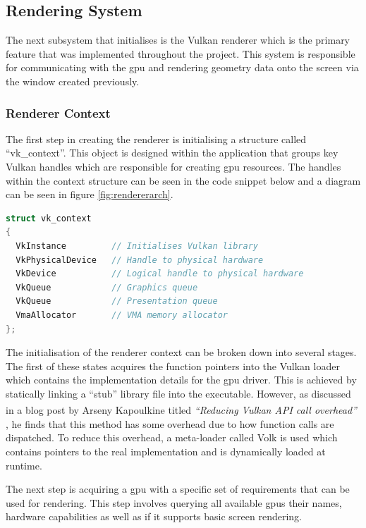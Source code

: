 \documentclass[11pt]{article}
\begin{document}
\subsection{Rendering System}
The next subsystem that initialises is the Vulkan renderer which is the primary
feature that was implemented throughout the project. This system is responsible
for communicating with the \gls*{gpu} and rendering geometry data onto the
screen via the window created previously.

\subsubsection{Renderer Context}
The first step in creating the renderer is initialising a structure called
``vk\_context''. This object is designed  within the application that groups key
Vulkan handles which are responsible for creating \gls*{gpu} resources. The
handles within the context structure can be seen in the code snippet below and a
diagram can be seen in figure \ref{fig:rendererarch}.

\begin{lstlisting}[language=C++]
struct vk_context
{
  VkInstance         // Initialises Vulkan library
  VkPhysicalDevice   // Handle to physical hardware
  VkDevice           // Logical handle to physical hardware
  VkQueue            // Graphics queue
  VkQueue            // Presentation queue
  VmaAllocator       // VMA memory allocator
};
\end{lstlisting}

The initialisation of the renderer context can be broken down into several
stages. The first of these states acquires the function pointers into the Vulkan
loader which contains the implementation details for the \gls*{gpu} driver. This
is achieved by statically linking a ``stub'' library file into the executable.
However, as discussed in a blog post by Arseny Kapoulkine titled
\textit{``Reducing Vulkan\textsuperscript{\textregistered} API call overhead''}
\cite{volk}, he finds that this method has some overhead due to how function
calls are dispatched. To reduce this overhead, a meta-loader called Volk is used
which contains pointers to the real implementation and is dynamically loaded at
runtime.

The next step is acquiring a \gls*{gpu} with a specific set of requirements that
can be used for rendering. This step involves querying all available \glspl*{gpu}
their names, hardware capabilities as well as if it supports basic screen
rendering.
\end{document}
